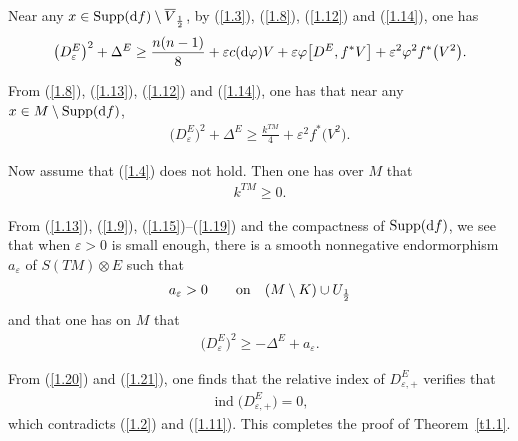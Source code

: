 Near any $x\in \operatorname{Supp}({\rm d}f)\setminus \overline{V}_{\frac{1}{2}}$, by
(\ref{1.3}), (\ref{1.8}), (\ref{1.12}) and (\ref{1.14}), one has
\begin{gather}\label{1.16}
\big(D_\varepsilon^E\big)^2+\Delta^E \geq \frac{n(n-1)}{8}+\varepsilon c({\rm d}\varphi)V+\varepsilon \varphi \big[D^E,f^*V\big]+\varepsilon^2\varphi^2f^*\big(V^2\big).
\end{gather}

From (\ref{1.8}), (\ref{1.13}), (\ref{1.12}) and (\ref{1.14}), one has that near any $x\in M\setminus \operatorname{Supp}({\rm d}f)$,
\begin{gather}\label{1.18}
\big(D_\varepsilon^E\big)^2+\Delta^E \geq \frac{k^{TM}}{4}+\varepsilon^2f^*\big(V^2\big).
\end{gather}

Now assume that (\ref{1.4}) does not hold. Then one has over $M$ that
 \begin{gather}\label{1.19}
k^{TM}\geq 0.
\end{gather}

From (\ref{1.13}), (\ref{1.9}), (\ref{1.15})--(\ref{1.19}) and the compactness of $\operatorname{Supp}({\rm d}f)$, we see that when $\varepsilon>0$ is small enough, there is a smooth nonnegative endormorphism $a_\varepsilon$ of $S(TM)\widehat\otimes E$ such that
 \begin{gather}\label{1.20}
a_\varepsilon>0 \qquad {\rm on}\quad (M\setminus K)\cup U_{\frac{1}{2}}
\end{gather}
and that one has on $M$ that
\begin{gather}\label{1.21}
\big(D_\varepsilon^E\big)^2 \geq -\Delta^E +a_\varepsilon.
\end{gather}

From (\ref{1.20}) and (\ref{1.21}), one finds that the relative index of $D^E_{\varepsilon,+}$ verifies that
\begin{gather*}%
\operatorname{ind}\big(D^E_{\varepsilon,+}\big)=0,
\end{gather*}
which contradicts (\ref{1.2}) and (\ref{1.11}). This completes the proof of Theorem~\ref{t1.1}.
